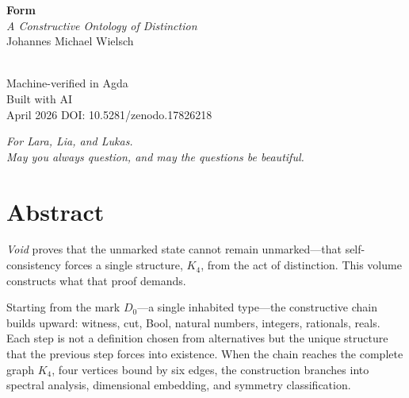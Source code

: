 \documentclass[11pt,a4paper]{book}
\begin{document}
\begin{titlepage}
\centering
\vspace*{3cm}
{\Huge\bfseries Form}\\[0.5cm]
{\Large\itshape A Constructive Ontology of Distinction}\\[2cm]
{\large Johannes Michael Wielsch}\\[4cm]
\\[4cm]
{\small Machine-verified in Agda}\\
{\small Built with AI}\\
\vfill
{\small April 2026}
{\small DOI: 10.5281/zenodo.17826218}\\[0.5cm]
\end{titlepage}

\thispagestyle{empty}
\vspace*{\fill}
\begin{center}
\textit{For Lara, Lia, and Lukas.}\\[0.6em]
\textit{May you always question, and may the questions be beautiful.}
\end{center}
\vspace*{\fill}

\clearpage

\frontmatter
\chapter*{Abstract}

\textit{Void} proves that the unmarked state cannot remain unmarked—that self-consistency forces a single structure, $K_4$, from the act of distinction. This volume constructs what that proof demands.

Starting from the mark $D_0$—a single inhabited type—the constructive chain builds upward: witness, cut, Bool, natural numbers, integers, rationals, reals. Each step is not a definition chosen from alternatives but the unique structure that the previous step forces into existence. When the chain reaches the complete graph $K_4$, four vertices bound by six edges, the construction branches into spectral analysis, dimensional embedding, and symmetry classification.
\end{document}
